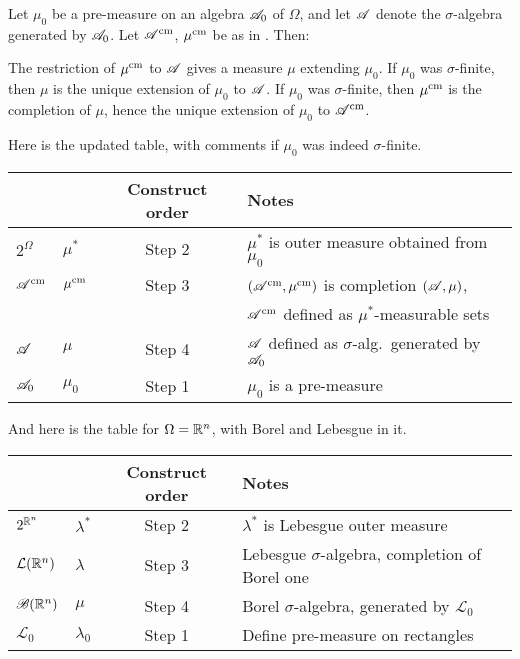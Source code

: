 \begin{theorem}
	\label{thm:cara_premeasure}
	Let $\mu_0$ be a pre-measure on an algebra $\mathscr A_0$ of $\Omega$,
	and let $\mathscr A$ denote the $\sigma$-algebra generated by $\mathscr A_0$.
	Let $\mathscr A^\text{cm}$, $\mu^\text{cm}$ be as in .
	Then:
	\begin{enumerate}[(a)]
		\ii The restriction of $\mu^\text{cm}$ to $\mathscr A$
		gives a measure $\mu$ extending $\mu_0$.
		\ii If $\mu_0$ was $\sigma$-finite,
		then $\mu$ is the unique extension of $\mu_0$ to $\mathscr A$.
		\ii If $\mu_0$ was $\sigma$-finite,
		then $\mu^\text{cm}$ is the completion of $\mu$,
		hence the unique extension of $\mu_0$ to $\mathscr A^\text{cm}$.
	\end{enumerate}
\end{theorem}
Here is the updated table, with comments if $\mu_0$ was indeed $\sigma$-finite.
\begin{center}
	\begin{tabular}[h]{llcl}
		& & Construct order & Notes \\ \hline
		$2^\Omega$ & $\mu^\ast$ & Step 2 &
			$\mu^\ast$ is outer measure obtained from $\mu_0$ \\[1em]
		$\mathscr A^\text{cm}$ & $\mu^\text{cm}$ & Step 3 & $(\mathscr A^\text{cm}, \mu^\text{cm})$ is completion $(\mathscr A, \mu)$, \\
		&&& $\mathscr A^\text{cm}$ defined as $\mu^\ast$-measurable sets \\[1em]
		$\mathscr A$ & $\mu$ & Step 4 & $\mathscr A$ defined as $\sigma$-alg.\ generated by $\mathscr A_0$ \\[1em]
		$\mathscr A_0$ & $\mu_0$ & Step 1 & $\mu_0$ is a pre-measure
	\end{tabular}
\end{center}
And here is the table for $\Omega = \mathbb R^n$,
with Borel and Lebesgue in it.
\begin{center}
	\begin{tabular}[h]{llcl}
		& & Construct order & Notes \\ \hline
		$2^{\mathbb R^n}$ & $\lambda^\ast$ & Step 2 &
			$\lambda^\ast$ is Lebesgue outer measure \\[1em]
		$\mathcal L(\mathbb R^n)$ & $\lambda$ & Step 3 &
			Lebesgue $\sigma$-algebra, completion of Borel one \\[1em]
		$\mathscr B(\mathbb R^n)$ & $\mu$ & Step 4 &
			Borel $\sigma$-algebra, generated by $\mathcal{L}_0$ \\[1em]
		$\mathcal L_0$ & $\lambda_0$ & Step 1 & Define pre-measure on rectangles
	\end{tabular}
\end{center}

